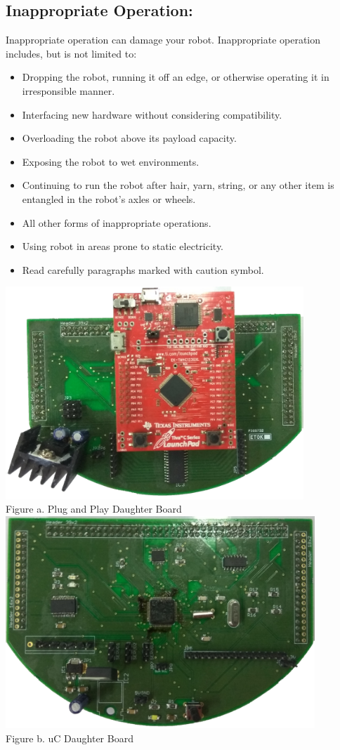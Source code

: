 \documentclass[a4paper,10pt,oneside]{article}
\begin{document}
{	\subsection{\textbf{Inappropriate Operation:}}
	Inappropriate operation can damage your robot. Inappropriate operation includes, but is not
	limited to:
	\begin{itemize}
	\item Dropping the robot, running it off an edge, or otherwise operating it in irresponsible
	manner.
	\item Interfacing new hardware without considering compatibility.
	\item Overloading the robot above its payload capacity.
	\item Exposing the robot to wet environments.
	\item Continuing to run the robot after hair, yarn, string, or any other item is entangled in the
	robot’s axles or wheels.
	\item All other forms of inappropriate operations.
	\item Using robot in areas prone to static electricity.
	\item Read carefully paragraphs marked with caution symbol.
	\end{itemize}
	\begin{center}
	\includegraphics[height=8cm]{Images/PP}\\
	Figure a. Plug and Play Daughter Board\\
	\includegraphics[height=8cm]{Images/uC}\\
	Figure b. uC Daughter Board\\
	\end{center}
}
\end{document}
